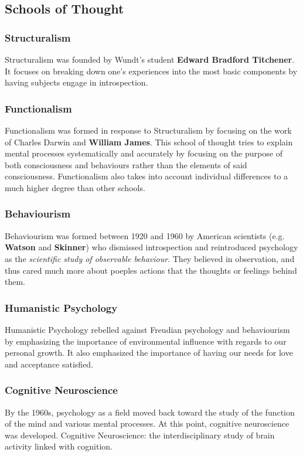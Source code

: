 \documentclass[12pt]{article}
\begin{document}
\subsection*{Schools of Thought}
\subsubsection*{Structuralism}
Structuralism was founded by Wundt's student {\bf Edward Bradford Titchener}. It focuses on breaking down one's experiences into the most basic components by having subjects engage in introspection.

\subsubsection*{Functionalism}
Functionalism was formed in response to Structuralism by focusing on the work of Charles Darwin and {\bf William James}. This school of thought tries to explain mental processes systematically and accurately by focusing on the purpose of both consciousness and behaviours rather than the elements of said consciousness. Functionalism also takes into account individual differences to a much higher degree than other schools.

\subsubsection*{Behaviourism}
Behaviourism was formed between 1920 and 1960 by American scientists (e.g. {\bf Watson} and {\bf Skinner}) who dismissed introspection and reintroduced psychology as the {\it scientific study of observable behaviour}. They believed in observation, and thus cared much more about poeples actions that the thoughts or feelings behind them.

\subsubsection*{Humanistic Psychology}
Humanistic Psychology rebelled against Freudian psychology and behaviourism by emphasizing the importance of environmental influence with regards to our personal growth. It also emphasized the importance of having our needs for love and acceptance satisfied.

\subsubsection*{Cognitive Neuroscience}
By the 1960s, psychology as a field moved back toward the study of the function of the mind and various mental processes. At this point, cognitive neuroscience was developed. Cognitive Neuroscience: the interdisciplinary study of brain activity linked with cognition.
\end{document}
